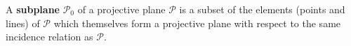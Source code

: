 A \textbf{subplane} $\mathcal{P}_0$ of a projective plane $\mathcal{P}$ is a subset of the elements (points and lines) of $\mathcal{P}$ which themselves form a projective plane with respect to the same incidence relation as $\mathcal{P}$.

